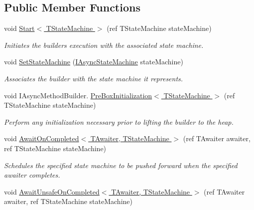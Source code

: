 \subsection*{Public Member Functions}
\begin{DoxyCompactItemize}
\item 
void \hyperlink{struct_system_1_1_runtime_1_1_compiler_services_1_1_async_void_method_builder_a2b3bc9b0d5b793a8671f6846b51eebf3}{Start$<$ T\+State\+Machine $>$} (ref T\+State\+Machine state\+Machine)
\begin{DoxyCompactList}\small\item\em Initiates the builder\textquotesingle{}s execution with the associated state machine.\end{DoxyCompactList}\item 
void \hyperlink{struct_system_1_1_runtime_1_1_compiler_services_1_1_async_void_method_builder_ad2728cc2a036d8b12682364d1b25010b}{Set\+State\+Machine} (\hyperlink{interface_system_1_1_runtime_1_1_compiler_services_1_1_i_async_state_machine}{I\+Async\+State\+Machine} state\+Machine)
\begin{DoxyCompactList}\small\item\em Associates the builder with the state machine it represents.\end{DoxyCompactList}\item 
void I\+Async\+Method\+Builder. \hyperlink{struct_system_1_1_runtime_1_1_compiler_services_1_1_async_void_method_builder_a663b7077696448270f562d50d3ca46b9}{Pre\+Box\+Initialization$<$ T\+State\+Machine $>$} (ref T\+State\+Machine state\+Machine)
\begin{DoxyCompactList}\small\item\em Perform any initialization necessary prior to lifting the builder to the heap.\end{DoxyCompactList}\item 
void \hyperlink{struct_system_1_1_runtime_1_1_compiler_services_1_1_async_void_method_builder_ab14a3a0fd8620657ecd75b0ef096aee7}{Await\+On\+Completed$<$ T\+Awaiter, T\+State\+Machine $>$} (ref T\+Awaiter awaiter, ref T\+State\+Machine state\+Machine)
\begin{DoxyCompactList}\small\item\em Schedules the specified state machine to be pushed forward when the specified awaiter completes. \end{DoxyCompactList}\item 
void \hyperlink{struct_system_1_1_runtime_1_1_compiler_services_1_1_async_void_method_builder_ae6c510dbdc77b3197b00fed939da2263}{Await\+Unsafe\+On\+Completed$<$ T\+Awaiter, T\+State\+Machine $>$} (ref T\+Awaiter awaiter, ref T\+State\+Machine state\+Machine)

\end{DoxyCompactItemize}
